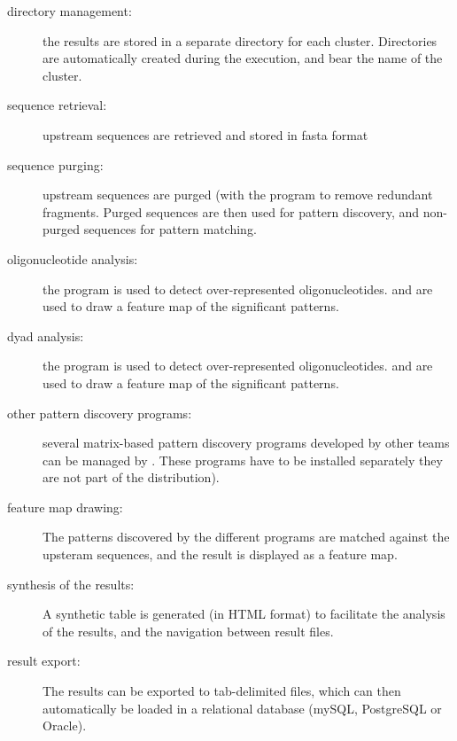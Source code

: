 \begin{description}
\item[directory management:] the results are stored in a separate
directory for each cluster. Directories are automatically created
during the execution, and bear the name of the cluster.

\item[sequence retrieval:] upstream sequences are retrieved and stored
in fasta format

\item[sequence purging:] upstream sequences are purged (with the
  program  to remove redundant
  fragments. Purged sequences are then used for pattern discovery, and
  non-purged sequences for pattern matching.

\item[oligonucleotide analysis:] the program 
  is used to detect over-represented
  oligonucleotides.  and 
  are used to draw a feature map of the significant patterns.

\item[dyad analysis:] the program  is used to
  detect over-represented oligonucleotides.  and
   are used to draw a feature map of the
  significant patterns.

\item[other pattern discovery programs:] several matrix-based pattern
discovery programs developed by other teams can be managed by 
. These programs have to be installed 
separately they are not part of the \RSAT distribution). 

\item[feature map drawing:] The patterns discovered by the different 
programs are matched against the  upsteram sequences, and the result 
is displayed as a feature map.

\item[synthesis of the results:] A synthetic table is generated (in HTML
  format) to facilitate the analysis of the results, and the
  navigation between result files.

\item[result export:] The results can be exported to tab-delimited
  files, which can then automatically be loaded in a relational
  database (mySQL, PostgreSQL or Oracle).

\end{description}


